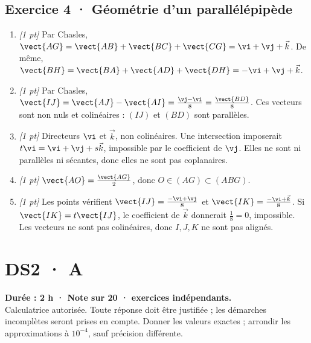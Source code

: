 \subsection*{Exercice 4 · Géométrie d'un parallélépipède}\begin{enumerate}

\item \textit{[1 pt]} Par Chasles, $\vect{AG}=\vect{AB}+\vect{BC}+\vect{CG}=\vi +\vj +\vec k$. De même, $\vect{BH}=\vect{BA}+\vect{AD}+\vect{DH}=-\vi +\vj +\vec k$.

\item \textit{[1 pt]} Par Chasles, $\vect{IJ}=\vect{AJ}-\vect{AI}=\frac{\vj -\vi }{8}=\frac{\vect{BD}}{8}$. Ces vecteurs sont non nuls et colinéaires : $(IJ)$ et $(BD)$ sont parallèles.

\item \textit{[1 pt]} Directeurs $\vi $ et $\vec k$, non colinéaires. Une intersection imposerait $t\vi =\vi +\vj +s\vec k$, impossible par le coefficient de $\vj $. Elles ne sont ni parallèles ni sécantes, donc elles ne sont pas coplanaires.

\item \textit{[1 pt]} $\vect{AO}=\frac{\vect{AG}}{2}$, donc $O\in(AG)\subset(ABG)$.

\item \textit{[1 pt]} Les points vérifient $\vect{IJ}=\frac{-\vi +\vj }{8}$ et $\vect{IK}=\frac{-\vi +\vec k}{8}$. Si $\vect{IK}=t\vect{IJ}$, le coefficient de $\vec k$ donnerait $\frac{1}{8}=0$, impossible. Les vecteurs ne sont pas colinéaires, donc $I,J,K$ ne sont pas alignés.

\end{enumerate}

\fi

\ifmxteacher

\mxnewpage{}\label{sujet:2-3}

\section*{DS2 · A}


\textbf{Durée : 2 h · Note sur 20 ·  exercices indépendants.}\\Calculatrice autorisée. Toute réponse doit être justifiée ; les démarches incomplètes seront prises en compte. Donner les valeurs exactes ; arrondir les approximations à $10^{-4}$, sauf précision différente.

